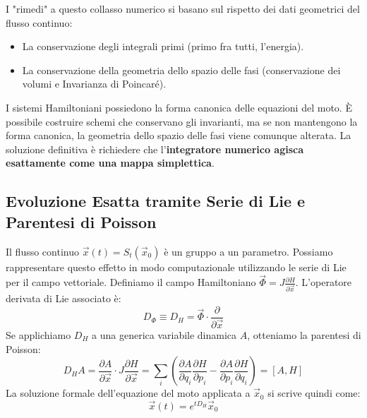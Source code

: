 \documentclass[12pt,a4paper]{article}
\begin{document}
I "rimedi" a questo collasso numerico si basano sul rispetto dei dati geometrici del flusso continuo:
\begin{itemize}
    \item La conservazione degli integrali primi (primo fra tutti, l'energia).
    \item La conservazione della geometria dello spazio delle fasi (conservazione dei volumi e Invarianza di Poincaré).
\end{itemize}
I sistemi Hamiltoniani possiedono la forma canonica delle equazioni del moto. È possibile costruire schemi che conservano gli invarianti, ma se non mantengono la forma canonica, la geometria dello spazio delle fasi viene comunque alterata. La soluzione definitiva è richiedere che l'\textbf{integratore numerico agisca esattamente come una mappa simplettica}.

\subsection{Evoluzione Esatta tramite Serie di Lie e Parentesi di Poisson}
Il flusso continuo $\vec{x}(t) = S_t(\vec{x}_0)$ è un gruppo a un parametro. Possiamo rappresentare questo effetto in modo computazionale utilizzando le serie di Lie per il campo vettoriale. 
Definiamo il campo Hamiltoniano $\vec{\Phi} = J \frac{\partial H}{\partial \vec{x}}$. L'operatore derivata di Lie associato è:
\begin{equation}
D_\Phi \equiv D_H = \vec{\Phi} \cdot \frac{\partial}{\partial \vec{x}}
\end{equation}
Se applichiamo $D_H$ a una generica variabile dinamica $A$, otteniamo la parentesi di Poisson:
\begin{equation}
D_H A = \frac{\partial A}{\partial \vec{x}} \cdot J \frac{\partial H}{\partial \vec{x}} = \sum_i \left( \frac{\partial A}{\partial q_i}\frac{\partial H}{\partial p_i} - \frac{\partial A}{\partial p_i}\frac{\partial H}{\partial q_i} \right) = [A, H]
\end{equation}
La soluzione formale dell'equazione del moto applicata a $\vec{x}_0$ si scrive quindi come:
\begin{equation}
\vec{x}(t) = e^{t D_H} \vec{x}_0
\end{equation}
\end{document}

